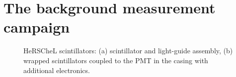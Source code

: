 \section{The background measurement campaign}
\label{sec:Measurement}






\begin{figure}
\centering
{}
\caption{\label{fig:scint}
HeRSCheL scintillators: (a) scintillator and light-guide assembly, (b) wrapped scintillators coupled to the PMT in the casing with additional electronics.
}
\end{figure}

